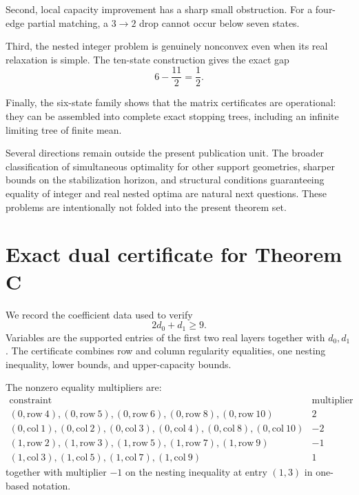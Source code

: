 \documentclass[11pt]{article}
\theoremstyle{definition}
\begin{document}
Second, local capacity improvement has a sharp small obstruction.
For a four-edge partial matching, a $3\to2$ drop cannot occur below seven states.

Third, the nested integer problem is genuinely nonconvex even when its real relaxation is simple.
The ten-state construction gives the exact gap
\[
6-\frac{11}{2}=\frac12.
\]

Finally, the six-state family shows that the matrix certificates are operational: they can be
assembled into complete exact stopping trees, including an infinite limiting tree of finite mean.

Several directions remain outside the present publication unit.  The broader classification of
simultaneous optimality for other support geometries, sharper bounds on the stabilization horizon,
and structural conditions guaranteeing equality of integer and real nested optima are natural
next questions.  These problems are intentionally not folded into the present theorem set.

\appendix

\section{Exact dual certificate for Theorem C}
\label{app:dual}

We record the coefficient data used to verify
\[
2d_0+d_1\ge9.
\]
Variables are the supported entries of the first two real layers together with $d_0,d_1$.
The certificate combines row and column regularity equalities, one nesting inequality, lower
bounds, and upper-capacity bounds.

The nonzero equality multipliers are:
\[
\begin{array}{c|r}
\text{constraint} & \text{multiplier}\\
\hline
(0,\mathrm{row}\ 4),(0,\mathrm{row}\ 5),(0,\mathrm{row}\ 6),
(0,\mathrm{row}\ 8),(0,\mathrm{row}\ 10) & 2\\
(0,\mathrm{col}\ 1),(0,\mathrm{col}\ 2),(0,\mathrm{col}\ 3),
(0,\mathrm{col}\ 4),(0,\mathrm{col}\ 8),(0,\mathrm{col}\ 10) & -2\\
(1,\mathrm{row}\ 2),(1,\mathrm{row}\ 3),(1,\mathrm{row}\ 5),
(1,\mathrm{row}\ 7),(1,\mathrm{row}\ 9) & -1\\
(1,\mathrm{col}\ 3),(1,\mathrm{col}\ 5),
(1,\mathrm{col}\ 7),(1,\mathrm{col}\ 9) & 1
\end{array}
\]
together with multiplier $-1$ on the nesting inequality at entry $(1,3)$ in one-based notation.
\end{document}
